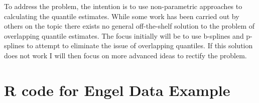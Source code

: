 \documentclass[12pt,a4paper]{report}
\begin{document}
To address the problem, the intention is to use non-parametric approaches to calculating the quantile estimates. While some work has been carried out by others on the topic there exists no general off-the-shelf solution to the problem of overlapping quantile estimates. The focus initially will be to use b-splines and p-splines to attempt to eliminate the issue of overlapping quantiles. If this solution does not work I will then focus on more advanced ideas to rectify the problem.

\newpage
{}



\newpage
\appendix
{}

\chapter{R code for Engel Data Example}
\end{document}
